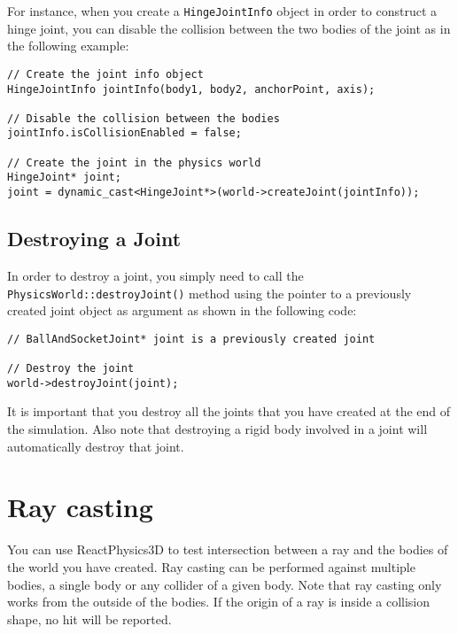\documentclass[a4paper,12pt]{article}
\begin{document}
    For instance, when you create a \texttt{HingeJointInfo} object in order to construct a hinge joint, you can disable the collision between the two bodies of the joint as in the
    following example: \\

    \begin{lstlisting}
// Create the joint info object
HingeJointInfo jointInfo(body1, body2, anchorPoint, axis);

// Disable the collision between the bodies
jointInfo.isCollisionEnabled = false;

// Create the joint in the physics world
HingeJoint* joint;
joint = dynamic_cast<HingeJoint*>(world->createJoint(jointInfo));
  \end{lstlisting}

    \subsection{Destroying a Joint}

    \begin{sloppypar}
    In order to destroy a joint, you simply need to call the \texttt{PhysicsWorld::destroyJoint()} method using the pointer to
    a previously created joint object as argument as shown in the following code: \\
   \end{sloppypar}

    \begin{lstlisting}
// BallAndSocketJoint* joint is a previously created joint

// Destroy the joint
world->destroyJoint(joint);
  \end{lstlisting}

    \vspace{0.6cm}

    It is important that you destroy all the joints that you have created at the end of the simulation. Also note that destroying a
    rigid body involved in a joint will automatically destroy that joint.

    \section{Ray casting}
    \label{sec:raycasting}

    You can use ReactPhysics3D to test intersection between a ray and the bodies of the world you have created. Ray casting can be performed against
    multiple bodies, a single body or any collider of a given body. Note that ray casting only works from the outside of the bodies. If the origin
    of a ray is inside a collision shape, no hit will be reported. \\
\end{document}
